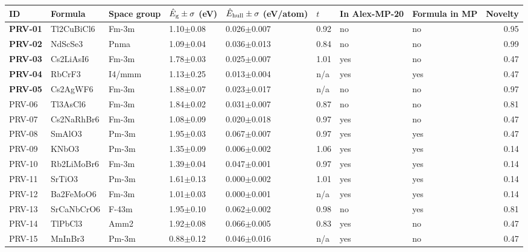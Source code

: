 \begin{tabular}{@{}llllllllr@{}}\toprule
 ID & Formula & Space group & $\hat E_{\rm g}\pm\sigma$ (eV) & $\hat E_{\rm hull}\pm\sigma$ (eV/atom) & $t$ & In Alex-MP-20 & Formula in MP & Novelty\\\midrule
\textbf{PRV-01} & Tl2CuBiCl6 & Fm-3m & 1.10$\pm$0.08 & 0.026$\pm$0.007 & 0.92 & no & no & 0.95 \\
\textbf{PRV-02} & NdScSe3 & Pnma & 1.09$\pm$0.04 & 0.036$\pm$0.013 & 0.84 & no & no & 0.99 \\
\textbf{PRV-03} & Cs2LiAsI6 & Fm-3m & 1.78$\pm$0.03 & 0.025$\pm$0.007 & 1.01 & yes & no & 0.47 \\
\textbf{PRV-04} & RbCrF3 & I4/mmm & 1.13$\pm$0.25 & 0.013$\pm$0.004 & n/a & yes & yes & 0.47 \\
\textbf{PRV-05} & Cs2AgWF6 & Fm-3m & 1.88$\pm$0.07 & 0.023$\pm$0.017 & n/a & no & no & 0.97 \\
PRV-06 & Tl3AsCl6 & Fm-3m & 1.84$\pm$0.02 & 0.031$\pm$0.007 & 0.87 & no & no & 0.81 \\
PRV-07 & Cs2NaRhBr6 & Fm-3m & 1.08$\pm$0.09 & 0.020$\pm$0.018 & 0.97 & yes & no & 0.47 \\
PRV-08 & SmAlO3 & Pm-3m & 1.95$\pm$0.03 & 0.067$\pm$0.007 & 0.97 & yes & yes & 0.47 \\
PRV-09 & KNbO3 & Pm-3m & 1.35$\pm$0.09 & 0.006$\pm$0.002 & 1.06 & yes & yes & 0.14 \\
PRV-10 & Rb2LiMoBr6 & Fm-3m & 1.39$\pm$0.04 & 0.047$\pm$0.001 & 0.97 & yes & yes & 0.14 \\
PRV-11 & SrTiO3 & Pm-3m & 1.61$\pm$0.13 & 0.000$\pm$0.002 & 1.01 & yes & yes & 0.14 \\
PRV-12 & Ba2FeMoO6 & Fm-3m & 1.01$\pm$0.03 & 0.000$\pm$0.001 & n/a & yes & yes & 0.14 \\
PRV-13 & SrCaNbCrO6 & F-43m & 1.95$\pm$0.10 & 0.062$\pm$0.002 & 0.98 & no & yes & 0.81 \\
PRV-14 & TlPbCl3 & Amm2 & 1.92$\pm$0.08 & 0.066$\pm$0.005 & 0.83 & yes & no & 0.47 \\
PRV-15 & MnInBr3 & Pm-3m & 0.88$\pm$0.12 & 0.046$\pm$0.016 & n/a & yes & no & 0.47 \\
\bottomrule\end{tabular}
